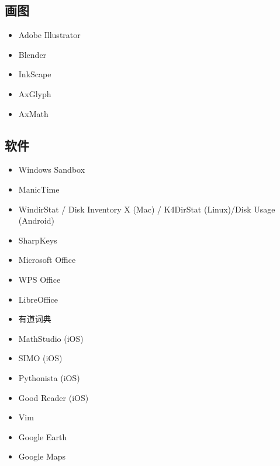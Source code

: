 \subsection{画图}
\begin{itemize}
\item Adobe Illustrator
\item Blender
\item InkScape
\item AxGlyph
\item AxMath
\end{itemize}

\subsection{软件}
\begin{itemize}
\item Windows Sandbox
\item ManicTime
\item WindirStat / Disk Inventory X (Mac) / K4DirStat (Linux)/Disk Usage (Android)
\item SharpKeys
\item Microsoft Office
\item WPS Office
\item LibreOffice
\item 有道词典
\item MathStudio (iOS)
\item SIMO (iOS)
\item Pythonista (iOS)
\item Good Reader (iOS)
\item Vim
\item Google Earth
\item Google Maps
\end{itemize}

